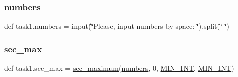 \subsubsection{\texorpdfstring{numbers}{numbers}}
{\footnotesize\ttfamily def task1.\+numbers = input(\char`\"{}Please, input numbers by space\+: \char`\"{}).split(\char`\"{} \char`\"{})}

\mbox{\label{namespacetask1_a4aa8290096a4764232477c95e630a6be}} 
\subsubsection{\texorpdfstring{sec\+\_\+max}{sec\_max}}
{\footnotesize\ttfamily def task1.\+sec\+\_\+max = \hyperlink{namespacetask1_a4a5a08378d4ee5b9ee7ae4562c950029}{sec\+\_\+maximum}(\hyperlink{namespacetask1_a0272177a25c59aef422644e1b7fcc098}{numbers}, 0, \hyperlink{namespacetask1_a0221130f97a54b7681577191e87653d9}{M\+I\+N\+\_\+\+I\+NT}, \hyperlink{namespacetask1_a0221130f97a54b7681577191e87653d9}{M\+I\+N\+\_\+\+I\+NT})}

